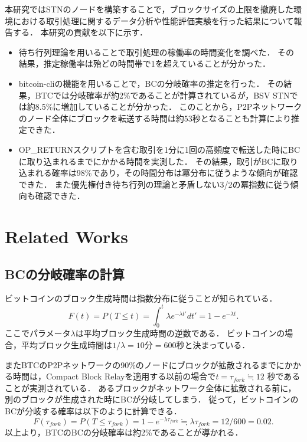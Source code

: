 \documentclass[graybox]{svmult}
\begin{document}
本研究ではSTNのノードを構築することで，ブロックサイズの上限を撤廃した環境における取引処理に関するデータ分析や性能評価実験を行った結果について報告する．
本研究の貢献を以下に示す．
%
\begin{itemize}
  \item 待ち行列理論を用いることで取引処理の稼働率の時間変化を調べた．
	その結果，推定稼働率は殆どの時間帯で1を超えていることが分かった．
  \item bitcoin-cliの機能を用いることで，BCの分岐確率の推定を行った．
	その結果，BTCでは分岐確率が約2\%であることが計算されているが，BSV STNでは約8.5\%に増加していることが分かった．
	このことから，P2Pネットワークのノード全体にブロックを転送する時間は約53秒となることも計算により推定できた．
  \item OP\_RETURNスクリプトを含む取引を1分に1回の高頻度で転送した時にBCに取り込まれるまでにかかる時間を実測した．
	その結果，取引がBCに取り込まれる確率は98\%であり，その時間分布は冪分布に従うような傾向が確認できた．
	また優先権付き待ち行列の理論と矛盾しない3/2の冪指数に従う傾向も確認できた．
\end{itemize}
%




\section{Related Works}
\label{sec:rworks}

\subsection{BCの分岐確率の計算}
\label{sec:fork}

ビットコインのブロック生成時間は指数分布に従うことが知られている．
%
\begin{equation}
	F(t) = P(T \le t) = \int_{0}^{t} \lambda e^{-\lambda t'} dt' = 1 - e^{-\lambda t}. \label{eq:exp}
\end{equation}
%
ここでパラメータ$\lambda$は平均ブロック生成時間の逆数である．
ビットコインの場合，平均ブロック生成時間は$1/\lambda=10$分$=600$秒と決まっている．

またBTCのP2Pネットワークの90\%のノードにブロックが拡散されるまでにかかる時間は，Compact Block Relayを適用する以前の場合で$t = \tau_{fork} \fallingdotseq 12$ 秒であることが実測されている\cite{bloX}．
あるブロックがネットワーク全体に拡散される前に，別のブロックが生成された時にBCが分岐してしまう．
従って，ビットコインのBCが分岐する確率は以下のように計算できる．
%
\begin{equation}
  F(\tau_{fork}) = P(T \le \tau_{fork}) = 1 - e^{-\lambda \tau_{fork}} \fallingdotseq \lambda \tau_{fork} = 12/600 = 0.02. 
\end{equation}
%
以上より，BTCのBCの分岐確率は約2\%であることが導かれる．
\end{document}
